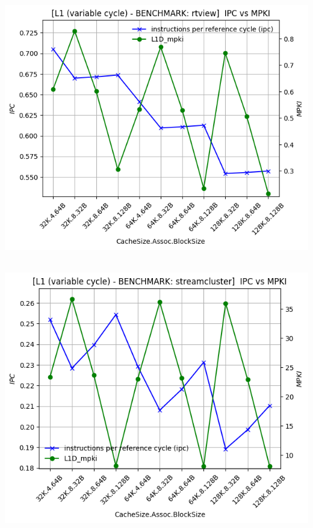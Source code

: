 \begin{minipage}{\textwidth}
    \begin{center}
        \\
        \vspace{3mm}
        \includegraphics[scale=0.65]{graphs/L1/var/rtview.png}
        \vspace{6mm}
    \end{center}
\end{minipage}

\begin{minipage}{\textwidth}
    \begin{center}
        \\
        \vspace{3mm}
        \includegraphics[scale=0.65]{graphs/L1/var/streamcluster.png}
        \vspace{6mm}
    \end{center}
\end{minipage}

